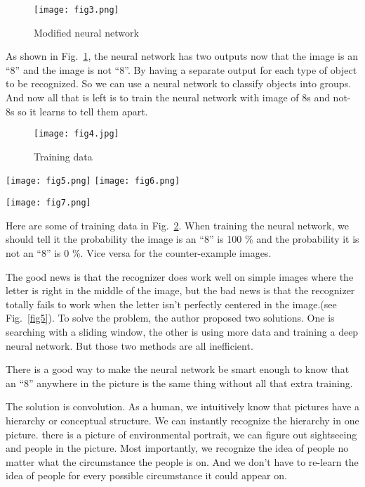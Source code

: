 \documentclass[10pt,twocolumn,letterpaper]{article}
\begin{document}
	\begin{figure}[h]
		\centering
		\texttt{[image: fig3.png]}
		\caption{Modified neural network}\label{fig3}
	\end{figure}
	\par	
	As shown in Fig.~\ref{fig3}, the neural network has two outputs now that the image is an ``8'' and the image is not ``8''. By having a separate output for each type of object to be recognized. So we can use a neural network to classify objects into groups. And now all that is left is to train the neural network with image of 8s and not-8s so it learns to tell them apart.
	\par
	\begin{figure}[h]
		\centering
		\texttt{[image: fig4.jpg]}
		\caption{Training data}\label{fig4}
	\end{figure}
	\begin{figure*}[t]
	\centering
	\texttt{[image: fig5.png]}
	\texttt{[image: fig6.png]}
	\caption{Good news and bad news}\label{fig5}
	\end{figure*}
	\begin{figure*}[h]
		\centering
		\texttt{[image: fig7.png]}
		\caption{A realistic deep convolution network.}\label{fig7}
	\end{figure*}
	Here are some of training data in Fig.~\ref{fig4}. When training the neural network, we should tell it the probability the image is an ``8'' is 100 \% and the probability it is not an ``8'' is 0 \%. Vice versa for the counter-example images.
	\par
	The good news is that the recognizer does work well on simple images where the letter is right in the middle of the image, but the bad news is that the recognizer totally fails to work when the letter isn't perfectly centered in the image.(see Fig.~\ref{fig5}). To solve the problem, the author proposed two solutions. One is searching with a sliding window, the other is using more data and training a deep neural network. But those two methods are all inefficient.
	\par
	There is a good way to make the neural network be smart enough to know that an ``8'' anywhere in the picture is the same thing without all that extra training.
	\par
	The solution is convolution. As a human, we intuitively know that pictures have a hierarchy or conceptual structure. We can instantly recognize the hierarchy in one picture. \Eg there is a picture of environmental portrait, we can figure out sightseeing and people in the picture. Most importantly, we recognize the idea of people no matter what the circumstance the people is on. And we don't have to re-learn the idea of people for every possible circumstance it could appear on.
\end{document}
